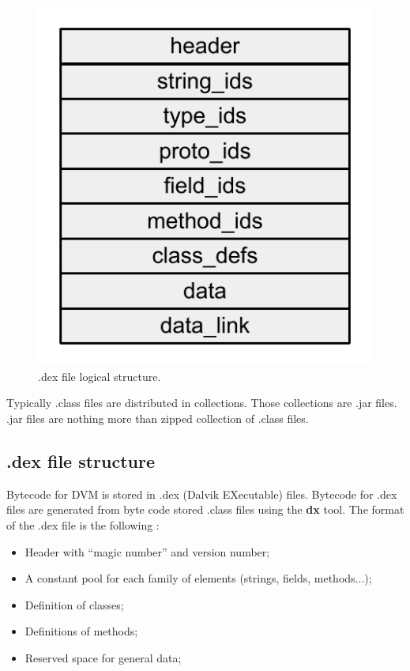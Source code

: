 \documentclass[11pt, oneside]{article}   	%
\begin{document}
\begin{figure}[h]
\begin{minipage}{.45\textwidth}
\includegraphics[width=\textwidth]{./images/dot_dex_file_structure.pdf}
\caption{.dex file logical structure.}
\label{fig:dex_structure}
\end{minipage}
\end{figure}

Typically .class files are distributed in collections. Those collections are .jar files. .jar files are nothing more than zipped collection of .class files.

\subsection{.dex file structure}

Bytecode for DVM is stored in .dex (Dalvik EXecutable) files. Bytecode for .dex files are generated from byte code stored .class files using the \textbf{dx} tool. The format of the .dex file is the following \cite{dot_dex_structure}:
\begin{itemize}
  \itemsep0pt
  \item Header with ``magic number'' and version number;
  \item A constant pool for each family of elements (strings, fields, methods...);
  \item Definition of classes;
  \item Definitions of methods;
  \item Reserved space for general data; 
\end{itemize} 
\end{document}
